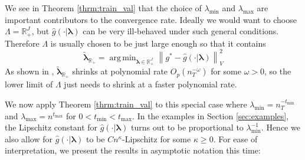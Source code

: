 \documentclass[12pt]{article}
\DeclareMathOperator*{\argmin}{arg\,min}
\begin{document}
We see in Theorem \ref{thrm:train_val} that the choice of $\lambda_{\min}$ and $\lambda_{\max}$ are important contributors to the convergence rate. Ideally we would want to choose $\Lambda = \mathbb{R}_+^{J}$, but $\hat g(\cdot | \boldsymbol{\lambda})$ can be very ill-behaved under such general conditions. Therefore $\Lambda$ is usually chosen to be just large enough so that it contains
\begin{equation}
\label{eq:true_oracle}
\tilde{\boldsymbol{\lambda}}_{\mathbb{R}_+}
= \argmin_{\boldsymbol{\lambda} \in \mathbb{R}^J_+}\left \| g^* - \hat{g}(\cdot | \boldsymbol \lambda) \right \|^2_V
\end{equation}
As shown in \citet{van2000empirical}, $\tilde{\boldsymbol{\lambda}}_{\mathbb{R}_+}$ shrinks at polynomial rate $O_p(n_T^{-\omega})$ for some $\omega>0$, so the lower limit of $\Lambda$ just needs to shrink at a faster polynomial rate.

We now apply Theorem \ref{thrm:train_val} to this special case where $\lambda_{\min} = n_T^{-t_{\min}}$ and $\lambda_{\max} = n^{t_{\max}}$ for $0 < t_{\min} < t_{\max}$. In the examples in Section \ref{sec:examples}, the Lipschitz constant for $\hat g(\cdot | \boldsymbol{\lambda})$ turns out to be proportional to $\lambda_{\min}^{-1}$. Hence we also allow for $\hat g(\cdot | \boldsymbol{\lambda})$ to be  $Cn^\kappa$-Lipschitz for some $\kappa \ge 0$. For ease of interpretation, we present the results in asymptotic notation this time:
\end{document}
